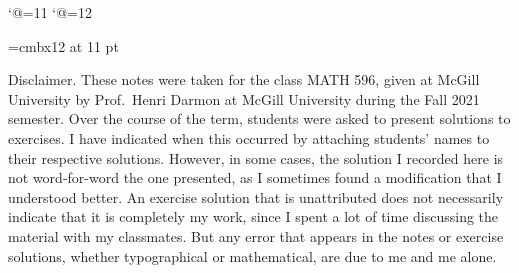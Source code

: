 


\def\AA{{\bf A}}
\def\FF{{\bf F}}
\def\HH{{\bf H}}
\def\PP{{\bf P}}
\def\H{{\cal H}}
\def\M{\op{\rm M}}
\def\calM{\mathop{\cal M}\nolimits}
\def\calS{\mathop{\cal S}\nolimits}
\def\T{{\rm T}}
\def\O{\op{\rm O}}
\def\SO{\op{\rm SO}}
\def\SL{\op{\rm SL}}
\def\GL{\op{\rm GL}}
\def\ord{\op{\rm ord}}
\def\disc{\op{\rm disc}}
\def\im{\op{\rm im}}
\def\Aut{\op{\rm Aut}}
\def\Stab{\op{\rm Stab}}
\def\Hom{\op{\rm Hom}}
\def\ortho{\mathbin{\widehat\oplus}}
\def\bar{\overline}
\def\pmod#1{\;({\rm mod}\;#1)}
\outer{}
\long{}
\long{}
\def\smallmatrix#1#2#3#4{
    \big({#1\atop #3}{#2\atop #4}\big)
}
\def\longto{\longrightarrow}
\def\hat{\widehat}

\widemargins
{}

\def\divides{\mathrel\backslash}
\catcode`@=11
\def\notdivides{\mathrel{\mathpalette\c@ncel\divides}}
\catcode`@=12 %

\font\elevenbf=cmbx12 at 11 pt


 \ninebf Disclaimer. \ninepoint
These notes were taken for the class MATH 596, given at McGill University by
Prof.~Henri Darmon at McGill University during the Fall 2021 semester. Over the course of the term,
students were asked to present solutions to exercises. I have indicated when this occurred by
attaching students' names to their respective solutions. However, in some cases, the solution I recorded
here is not word-for-word the one presented, as I sometimes found a modification that I understood better.
An exercise solution that is unattributed does
not necessarily indicate that it is
completely my work, since I spent a lot of time discussing the material with my classmates.
But any error that appears in the notes
or exercise solutions, whether typographical or mathematical, are due to me and me alone.

